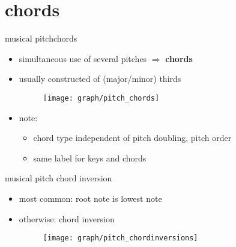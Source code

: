     \section{chords}
        \begin{frame}{musical pitch}{chords}
            \begin{itemize}
                \item	simultaneous use of several pitches $\Rightarrow$ \textbf{chords}
                \item	usually constructed of (major/minor) thirds
                \begin{figure}[t]
                    \centering
                    \texttt{[image: graph/pitch\_chords]}
                \end{figure}
                
                \smallskip
                \item<2->	note:
                        \begin{itemize}
                            \item	chord type independent of pitch doubling, pitch order
                            \item	same label for keys and chords
                        \end{itemize}
            \end{itemize}
        \end{frame}
        
        \begin{frame}{musical pitch}{ chord inversion}
            \begin{itemize}
                \item	most common: root note is lowest note
                \item	otherwise: chord inversion
                \begin{figure}[t]
                    \centering
                    \texttt{[image: graph/pitch\_chordinversions]}
                \end{figure}
                
            \end{itemize}
        \end{frame}
        
